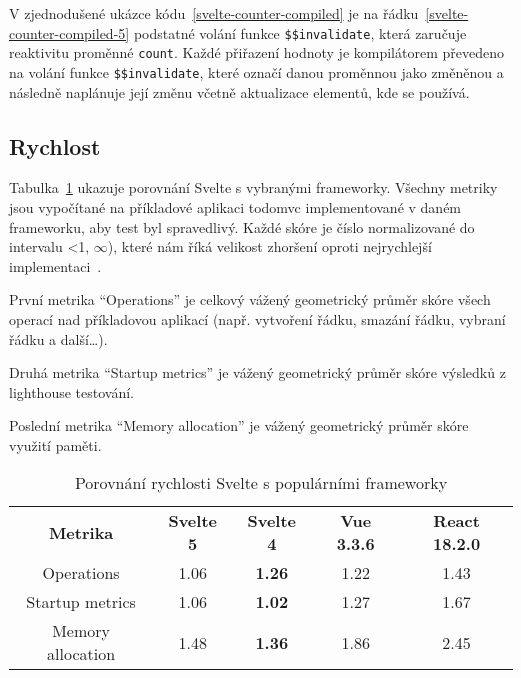 V zjednodušené ukázce kódu~\ref{svelte-counter-compiled} je na řádku~\ref{svelte-counter-compiled-5} podstatné volání funkce \texttt{\$\$invalidate}, která zaručuje reaktivitu proměnné \texttt{count}.
Každé přiřazení hodnoty je kompilátorem převedeno na volání funkce \texttt{\$\$invalidate}, které označí danou proměnnou jako změněnou a následně naplánuje její změnu včetně aktualizace elementů, kde se používá.

\subsection{Rychlost}

Tabulka~\ref{tab:foobar} ukazuje porovnání Svelte s vybranými frameworky.
Všechny metriky jsou vypočítané na příkladové aplikaci \gls{todomvc} implementované v daném frameworku, aby test byl spravedlivý.
Každé skóre je číslo normalizované do intervalu <1, $\infty$), které nám říká velikost zhoršení oproti nejrychlejší implementaci~\cite{krausest119,krausest120}.

První metrika ``Operations'' je celkový vážený geometrický průměr skóre všech operací nad příkladovou aplikací (např. vytvoření řádku, smazání řádku, vybraní řádku a další\dots).

Druhá metrika ``Startup metrics'' je vážený geometrický průměr skóre výsledků z \gls{lighthouse} testování.

Poslední metrika ``Memory allocation'' je vážený geometrický průměr skóre využití paměti.


\begin{table}[ht]
    \begin{tabular}{c|c|c|c|c}
        \bfseries Metrika & \bfseries{Svelte 5} & \bfseries{Svelte 4} & \bfseries{Vue 3.3.6} & \bfseries{React 18.2.0} \\\Midrule{}
        Operations        & 1.06                & \textbf{1.26}       & 1.22                 & 1.43                    \\
        Startup metrics   & 1.06                & \textbf{1.02}       & 1.27                 & 1.67                    \\
        Memory allocation & 1.48                & \textbf{1.36}       & 1.86                 & 2.45
    \end{tabular}
    \caption{Porovnání rychlosti Svelte s populárními frameworky}
    \label{tab:foobar}
\end{table}

